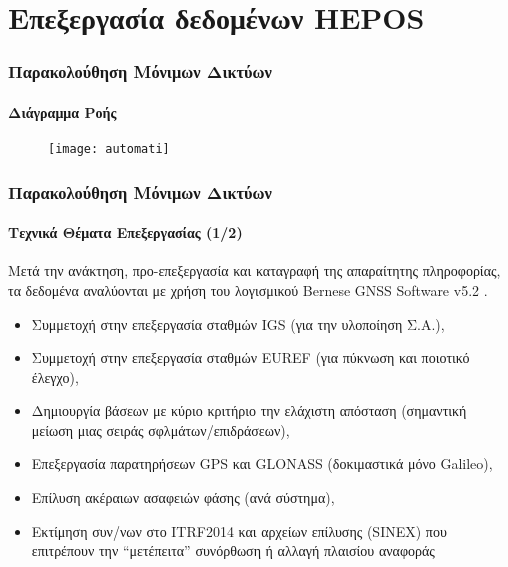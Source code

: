 \section{Επεξεργασία δεδομένων HEPOS}
\begin{frame}
  \frametitle{Παρακολούθηση Μόνιμων Δικτύων}
  \framesubtitle{Διάγραμμα Ροής}
  \label{}

    \begin{figure}
        \centering
        \texttt{[image: automati]}
    \end{figure}

\end{frame}
\note{}

\begin{frame}
  \frametitle{Παρακολούθηση Μόνιμων Δικτύων}
  \framesubtitle{Τεχνικά Θέματα Επεξεργασίας (1/2)}
  \label{}

    Μετά την ανάκτηση, προ-επεξεργασία και καταγραφή της απαραίτητης πληροφορίας, τα
    δεδομένα αναλύονται με χρήση του λογισμικού Bernese GNSS Software v5.2 \citep{bernese}.
    \begin{itemize}
        \item Συμμετοχή στην επεξεργασία σταθμών IGS (για την υλοποίηση Σ.Α.),
        \item Συμμετοχή στην επεξεργασία σταθμών EUREF (για πύκνωση και ποιοτικό έλεγχο),
        \item Δημιουργία βάσεων με κύριο κριτήριο την ελάχιστη απόσταση (σημαντική μείωση μιας σειράς σφλμάτων/επιδράσεων),
        \item Επεξεργασία παρατηρήσεων GPS και GLONASS (δοκιμαστικά μόνο Galileo),
        \item Επίλυση ακέραιων ασαφειών φάσης (ανά σύστημα),
        \item Εκτίμηση συν/νων στο ITRF2014 και αρχείων επίλυσης (SINEX) που επιτρέπουν την ``μετέπειτα'' συνόρθωση ή αλλαγή πλαισίου αναφοράς
    \end{itemize}
\end{frame}
\note{}

